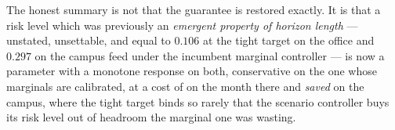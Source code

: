The honest summary is not that the guarantee is restored exactly. It is that a
risk level which was previously an \emph{emergent property of horizon length}
--- unstated, unsettable, and equal to $0.106$ at the tight target on the
office and $0.297$ on the campus feed under the incumbent marginal controller
--- is now a parameter with a monotone response on both, conservative on the
one whose marginals are calibrated, at a cost of  on the month
there and  \emph{saved} on the campus, where the tight target
binds so rarely that the scenario controller buys its risk level out of
headroom the marginal one was wasting.
